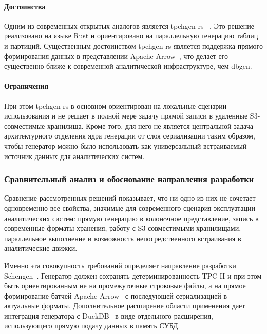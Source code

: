 \paragraph{Достоинства}

Одним из современных открытых аналогов является tpchgen-rs
~\cite{tpchgen-rs}. Это решение реализовано на языке Rust и ориентировано на
параллельную генерацию таблиц и партиций. Существенным достоинством
tpchgen-rs является поддержка прямого формирования данных в
представлении Apache Arrow~\cite{apache-arrow}, что делает его существенно ближе к современной
аналитической инфраструктуре, чем dbgen.

\paragraph{Ограничения}

При этом tpchgen-rs в основном ориентирован на локальные сценарии
использования и не решает в полной мере задачу прямой записи в удаленные
S3-совместимые хранилища. Кроме того, для него не является центральной
задача архитектурного отделения ядра генерации от слоя сериализации таким
образом, чтобы генератор можно было использовать как универсальный встраиваемый
источник данных для аналитических систем.

\subsubsection{Сравнительный анализ и обоснование направления разработки}

Сравнение рассмотренных решений показывает, что ни одно из них не сочетает
одновременно все свойства, значимые для современного сценария эксплуатации
аналитических систем: прямую генерацию в колонoчное представление, запись в
современные форматы хранения, работу с S3-совместимыми хранилищами,
параллельное выполнение и возможность непосредственного встраивания в
аналитические движки.

Именно эта совокупность требований определяет направление разработки
Schengen~\cite{schengen-repo}. Генератор должен сохранять
детерминированность TPC-H и при этом быть ориентированным не на промежуточные
строковые файлы, а на прямое формирование батчей Apache Arrow~\cite{apache-arrow} с последующей
сериализацией в актуальные форматы. Дополнительное расширение области
применения дает интеграция генератора с DuckDB~\cite{schengen-duckdb-repo} в виде отдельного расширения,
использующего прямую подачу данных в память СУБД.

